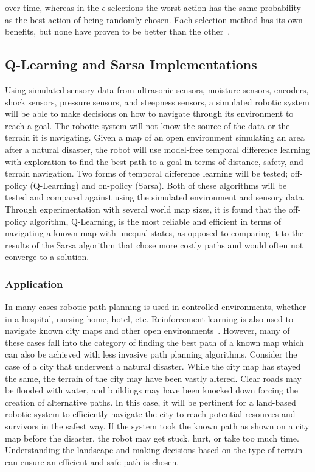 \documentclass[12pt,american]{report}
\begin{document}
over time, whereas in the \begin{math}\epsilon\end{math} selections the worst action has the same probability as the best action of being randomly chosen.  Each selection method has its own benefits, but none have proven to be better than the other~\cite{Eden}.


\subsection{Q-Learning and Sarsa Implementations}
Using simulated sensory data from ultrasonic sensors, moisture sensors, encoders, shock sensors, pressure sensors, and steepness sensors, a simulated robotic system will be able to make decisions on how to navigate through its environment to reach a goal.  The robotic system will not know the source of the data or the terrain it is navigating.  Given a map of an open environment simulating an area after a natural disaster, the robot will use model-free temporal difference learning with exploration to find the best path to a goal in terms of distance, safety, and terrain navigation. Two forms of temporal difference learning will be tested; off-policy (Q-Learning) and on-policy (Sarsa). Both of these algorithms will be tested and compared against using the simulated environment and sensory data. Through experimentation with several world map sizes, it is found that the off-policy algorithm, Q-Learning, is the most reliable and efficient in terms of navigating a known map with unequal states, as opposed to comparing it to the results of the Sarsa algorithm that chose more costly paths and would often not converge to a solution.

\subsubsection{Application}
In many cases robotic path planning is used in controlled environments, whether in a hospital, nursing home, hotel, etc. Reinforcement learning is also used to navigate known city maps and other open environments~\cite{peng2015mobile}. However, many of these cases fall into the category of finding the best path of a known map which can also be achieved with less invasive path planning algorithms. Consider the case of a city that underwent a natural disaster.  While the city map has stayed the same, the terrain of the city may have been vastly altered. Clear roads may be flooded with water, and buildings may have been knocked down forcing the creation of alternative paths. In this case, it will be pertinent for a land-based robotic system to efficiently navigate the city to reach potential resources and survivors in the safest way.  If the system took the known path as shown on a city map before the disaster, the robot may get stuck, hurt, or take too much time.  Understanding the landscape and making decisions based on the type of terrain can ensure an efficient and safe path is chosen.
\end{document}
